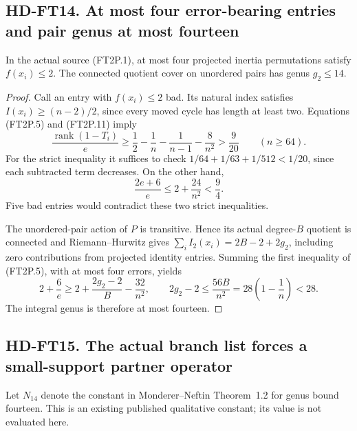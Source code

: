 \subsection*{HD-FT14. At most four error-bearing entries and pair genus at most fourteen}

\begin{proposition}[HD-FT14]
In the actual source (FT2P.1), at most four projected inertia
permutations satisfy \(f(x_i)\le2\).  The connected quotient cover
on unordered pairs has genus \(g_2\le14\).
\end{proposition}

\begin{proof}
Call an entry with \(f(x_i)\le2\) bad.  Its natural index satisfies
\(I(x_i)\ge(n-2)/2\), since every moved cycle has length at least two.
Equations (FT2P.5) and (FT2P.11) imply
\[
 \frac{\operatorname{rank}(1-T_i)}e
 \ge\frac12-\frac1n-\frac1{n-1}-\frac8{n^2}
 >\frac9{20}\qquad(n\ge64).
 \tag{FT2P.12}
\]
For the strict inequality it suffices to check
\(1/64+1/63+1/512<1/20\), since each subtracted term decreases.
On the other hand,
\[
 \frac{2e+6}{e}\le2+\frac{24}{n^2}<\frac94.
 \tag{FT2P.13}
\]
Five bad entries would contradict these two strict inequalities.

The unordered-pair action of \(P\) is transitive.  Hence its actual
degree-\(B\) quotient is connected and Riemann--Hurwitz gives
\(\sum_i I_2(x_i)=2B-2+2g_2\), including zero contributions from
projected identity entries.  Summing the first inequality of
(FT2P.5), with at most four errors, yields
\[
 2+\frac6e\ge2+\frac{2g_2-2}{B}-\frac{32}{n^2},
 \qquad
 2g_2-2\le\frac{56B}{n^2}
             =28\left(1-\frac1n\right)<28.
 \tag{FT2P.14}
\]
The integral genus is therefore at most fourteen.
\end{proof}

\subsection*{HD-FT15. The actual branch list forces a small-support partner operator}

Let \(N_{14}\) denote the constant in Monderer--Neftin Theorem~1.2
for genus bound fourteen.  This is an existing published qualitative
constant; its value is not evaluated here.
\cite[Theorems~1.2 and 5.1; Proposition~4.1 and Table~2.1]{HD:MondererNeftin2022}

